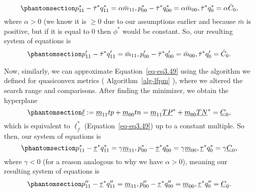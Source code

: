 \documentclass[
  letterpaper,
  numbers=noenddot,
  DIV=11]{scrreprt}
\theoremstyle{definition}
\theoremstyle{plain}
\theoremstyle{plain}
\theoremstyle{remark}
\begin{document}
\begin{equation}\phantomsection\label{eq-eq3.52}{p_{11}^{*}-\bar{\tau}^{*} q_{11}^{*}=\alpha \bar{m}_{11}, p_{00}^{*}-\bar{\tau}^{*} q_{00}^{*}=\alpha \bar{m}_{00}, \bar{\tau}^{*} q_{0}^{*}=\alpha \bar{C}_{0},}\end{equation}
where \(\alpha > 0\) (we know it is \(\geq0\) due to our assumptions
earlier and because \(\bar{m}\) is positive, but if it is equal to \(0\)
then \(\phi^*\) would be constant. So, our resulting system of equations
is \begin{equation}\phantomsection\label{eq-eq3.53}{\begin{aligned}
    p_{11}^{\prime}-\bar{\tau}^{*} q_{11}^{\prime}=\bar{m}_{11}, p_{00}^{\prime}-\bar{\tau}^{*} q_{00}^{\prime}=\bar{m}_{00}, \bar{\tau}^{*} q_{0}^{\prime}=\bar{C}_{0}.
\end{aligned}}\end{equation}

Now, similarly, we can approximate Equation~\ref{eq-eq3.49} using the
algorithm we defined for quasiconvex metrics
( Algorithm~\ref{alg-lfpm} ), where we altered the search range and
comparisons. After finding the minimizer, we obtain the hyperplane
\begin{equation}\phantomsection\label{eq-eq3.54}{\underline{\ell}:=\underline{m}_{11} t p+\underline{m}_{00} t n=\underline{m}_{11} \underline{TP}^{*}+\underline{m}_{00} \underline{TN}^{*} = \underline{C}_{0},}\end{equation}
which is equivalent to \(\underline{\ell}_{f}^{*}\)
(Equation~\ref{eq-eq3.49}) up to a constant multiple. So then, our
system of equations is
\begin{equation}\phantomsection\label{eq-eq3.55}{p_{11}^{*}-\underline{\tau}^{*} q_{11}^{*}=\gamma \underline{m}_{11}, p_{00}^{*}-\underline{\tau}^{*} q_{00}^{*}=\gamma \underline{m}_{00}, \underline{\tau}^{*} q_{0}^{*}=\gamma \underline{C}_{0},}\end{equation}
where \(\gamma <0\) (for a reason analogous to why we have
\(\alpha >0\)), meaning our resulting system of equations is
\begin{equation}\phantomsection\label{eq-eq3.56}{\begin{aligned}
    p_{11}^{\prime \prime}-\underline{\tau}^{*} q_{11}^{\prime \prime}=\underline{m}_{11}, p_{00}^{\prime \prime}-\underline{\tau}^{*} q_{00}^{\prime \prime}=\underline{m}_{00}, \underline{\tau}^{*} q_{0}^{\prime \prime}=\underline{C}_{0}.
\end{aligned}}\end{equation}
\end{document}
